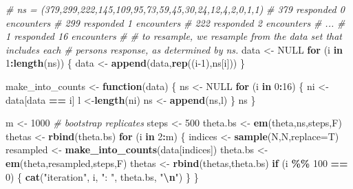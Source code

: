 \documentclass[
]{article}
\newenvironment{Shaded}{\begin{snugshade}}{\end{snugshade}}
\newcommand{\AttributeTok}[1]{\textcolor[rgb]{0.13,0.29,0.53}{#1}}
\newcommand{\CommentTok}[1]{\textcolor[rgb]{0.56,0.35,0.01}{\textit{#1}}}
\newcommand{\ConstantTok}[1]{\textcolor[rgb]{0.56,0.35,0.01}{#1}}
\newcommand{\ControlFlowTok}[1]{\textcolor[rgb]{0.13,0.29,0.53}{\textbf{#1}}}
\newcommand{\DecValTok}[1]{\textcolor[rgb]{0.00,0.00,0.81}{#1}}
\newcommand{\FunctionTok}[1]{\textcolor[rgb]{0.13,0.29,0.53}{\textbf{#1}}}
\newcommand{\NormalTok}[1]{#1}
\newcommand{\OtherTok}[1]{\textcolor[rgb]{0.56,0.35,0.01}{#1}}
\newcommand{\SpecialCharTok}[1]{\textcolor[rgb]{0.81,0.36,0.00}{\textbf{#1}}}
\newcommand{\StringTok}[1]{\textcolor[rgb]{0.31,0.60,0.02}{#1}}
\begin{document}
\begin{Shaded}
\begin{Highlighting}[]
\CommentTok{\# ns = (379,299,222,145,109,95,73,59,45,30,24,12,4,2,0,1,1)}
\CommentTok{\# 379 responded 0 encounters}
\CommentTok{\# 299 responded 1 encounters}
\CommentTok{\# 222 responded 2 encounters}
\CommentTok{\# ...}
\CommentTok{\# 1 responded 16 encounters}
\CommentTok{\#}
\CommentTok{\# to resample, we resample from the data set that includes each}
\CommentTok{\# persons response, as determined by ns.}
\NormalTok{data }\OtherTok{\textless{}{-}} \ConstantTok{NULL}
\ControlFlowTok{for}\NormalTok{ (i }\ControlFlowTok{in} \DecValTok{1}\SpecialCharTok{:}\FunctionTok{length}\NormalTok{(ns))}
\NormalTok{\{}
\NormalTok{  data }\OtherTok{\textless{}{-}} \FunctionTok{append}\NormalTok{(data,}\FunctionTok{rep}\NormalTok{((i}\DecValTok{{-}1}\NormalTok{),ns[i]))}
\NormalTok{\}}

\NormalTok{make\_into\_counts }\OtherTok{\textless{}{-}} \ControlFlowTok{function}\NormalTok{(data)}
\NormalTok{\{}
\NormalTok{  ns }\OtherTok{\textless{}{-}} \ConstantTok{NULL}
  \ControlFlowTok{for}\NormalTok{ (i }\ControlFlowTok{in} \DecValTok{0}\SpecialCharTok{:}\DecValTok{16}\NormalTok{)}
\NormalTok{  \{}
\NormalTok{    ni }\OtherTok{\textless{}{-}}\NormalTok{ data[data }\SpecialCharTok{==}\NormalTok{ i]}
\NormalTok{    l }\OtherTok{\textless{}{-}}\FunctionTok{length}\NormalTok{(ni)}
\NormalTok{    ns }\OtherTok{\textless{}{-}} \FunctionTok{append}\NormalTok{(ns,l)}
\NormalTok{  \}}
\NormalTok{  ns}
\NormalTok{\}}

\NormalTok{m }\OtherTok{\textless{}{-}} \DecValTok{1000} \CommentTok{\# bootstrap replicates}
\NormalTok{steps }\OtherTok{\textless{}{-}} \DecValTok{500}
\NormalTok{theta.bs }\OtherTok{\textless{}{-}} \FunctionTok{em}\NormalTok{(theta,ns,steps,F)}
\NormalTok{thetas }\OtherTok{\textless{}{-}} \FunctionTok{rbind}\NormalTok{(theta.bs)}
\ControlFlowTok{for}\NormalTok{ (i }\ControlFlowTok{in} \DecValTok{2}\SpecialCharTok{:}\NormalTok{m)}
\NormalTok{\{}
\NormalTok{  indices }\OtherTok{\textless{}{-}} \FunctionTok{sample}\NormalTok{(N,N,}\AttributeTok{replace=}\NormalTok{T)}
\NormalTok{  resampled }\OtherTok{\textless{}{-}} \FunctionTok{make\_into\_counts}\NormalTok{(data[indices])}
\NormalTok{  theta.bs }\OtherTok{\textless{}{-}} \FunctionTok{em}\NormalTok{(theta,resampled,steps,F)}
\NormalTok{  thetas }\OtherTok{\textless{}{-}} \FunctionTok{rbind}\NormalTok{(thetas,theta.bs)}
  \ControlFlowTok{if}\NormalTok{ (i }\SpecialCharTok{\%\%} \DecValTok{100} \SpecialCharTok{==} \DecValTok{0}\NormalTok{) \{ }\FunctionTok{cat}\NormalTok{(}\StringTok{"iteration"}\NormalTok{, i, }\StringTok{": "}\NormalTok{, theta.bs, }\StringTok{"}\SpecialCharTok{\textbackslash{}n}\StringTok{"}\NormalTok{) \}}
\NormalTok{\}}
\end{Highlighting}
\end{Shaded}
\end{document}
